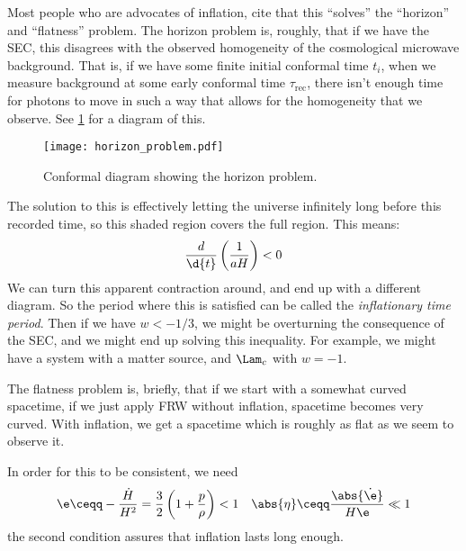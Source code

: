 \documentclass{booc}
\begin{document}
Most people who are advocates of inflation, cite that this ``solves'' the ``horizon''
and ``flatness'' problem.
The horizon problem is, roughly, that if we have the SEC, 
this disagrees with the observed homogeneity of the cosmological microwave background. 
That is, if we have some finite initial conformal time $t_i$,
when we measure background at some early conformal time $\tau_{\text{rec}}$, there isn't
enough time for photons to move in such a way that allows for the homogeneity that we observe. 
See \cref{fig:horizon_problem} for a diagram of this.
\begin{figure}
\centering
\texttt{[image: horizon\_problem.pdf]}
\caption{Conformal diagram showing the horizon problem.}
\label{fig:horizon_problem}
\end{figure}
The solution to this is effectively letting the universe infinitely long before this recorded time, 
so this shaded region covers the full region. This means:
\begin{equation}
\frac{d}{\d{t}} \left( \frac{1}{aH} \right) < 0
\end{equation}
We can turn this apparent contraction around, and end up with a different diagram. 
So the period where this is satisfied can be called the \emph{inflationary time period}.
Then if we have $w < -1/3$, we might be overturning the consequence of the SEC, and
we might end up solving this inequality. 
For example, we might have a system with a matter source, and $\Lam_c$ with $w = -1$. 

The flatness problem is, briefly, that if we start with a somewhat curved spacetime, if we just apply
FRW without inflation, spacetime becomes very curved. With inflation, we get a spacetime which is
roughly as flat as we seem to observe it.

In order for this to be consistent, we need 
\begin{align}
\e \ceqq - \frac{\dot H}{H^2} = 
\frac{3}{2}\left( 1 + \frac{p}{\rho} \right) < 1
&&
\abs{\eta} \ceqq  \frac{\abs{\dot \e}}{H\e} \ll 1
\end{align}
the second condition assures that inflation lasts long enough. 
\end{document}
